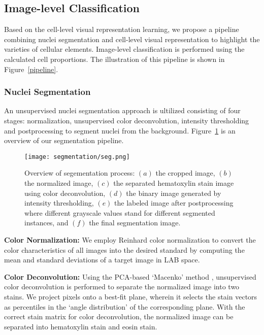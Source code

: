 \documentclass[journal]{IEEEtran}
\begin{document}
\subsection{Image-level Classification}
Based on the cell-level visual representation learning, we propose a pipeline combining nuclei segmentation and cell-level visual representation to highlight the varieties of cellular elements. Image-level classification is performed using the calculated cell proportions. The illustration of this pipeline is shown in Figure~\ref{pipeline}.


\subsubsection{Nuclei Segmentation}

An unsupervised nuclei segmentation approach is ultilized consisting of four stages: normalization, unsupervised color deconvolution, intensity thresholding and postprocessing to segment nuclei from the background. Figure~\ref{segmentation} is an overview of our segmentation pipeline.

\begin{figure}[t]
\texttt{[image: segmentation/seg.png]}  
\caption{Overview of segementation process: $\displaystyle (a)$ the cropped image, $\displaystyle (b)$ the normalized image, $\displaystyle (c)$ the separated hematoxylin stain image using color deconvolution, $\displaystyle (d)$ the binary image generated by intensity thresholding, $\displaystyle (e)$ the labeled image after postprocessing where different grayscale values stand for different segmented instances, and $\displaystyle (f)$ the final segmentation image.} 
\label{segmentation} 
\end{figure}
\textbf{Color Normalization:} We employ Reinhard color normalization \cite{Reinhard2001Color} to convert the color characteristics of all images into the desired standard by computing the mean and standard deviations of a target image in LAB space.

\textbf{Color Deconvolution:} Using the PCA-based `Macenko' method \cite{Macenko2009A}, unsupervised color deconvolution is performed to separate the normalized image into two stains. We project pixels onto a best-fit plane, wherein it selects the stain vectors as percentiles in the `angle distribution' of the corresponding plane. With the correct stain matrix for color deconvolution, the normalized image can be separated into hematoxylin stain and eosin stain.
\end{document}
